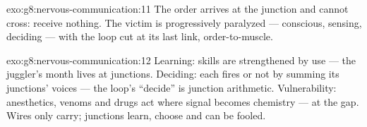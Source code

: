 \begin{solution}{exo:g8:nervous-communication:11}
The order arrives at the junction and cannot cross: 
receive nothing. The victim is progressively paralyzed ---
conscious, sensing, deciding --- with the loop cut at its
last link, order-to-muscle.
\end{solution}

\begin{solution}{exo:g8:nervous-communication:12}
Learning: skills are  strengthened by use --- the
juggler's month lives at junctions. Deciding: each 
fires or not by summing its junctions' voices --- the
loop's ``decide'' is junction arithmetic. Vulnerability:
anesthetics, venoms and drugs act where signal becomes
chemistry --- at the gap. Wires only carry; junctions
learn, choose and can be fooled.
\end{solution}

